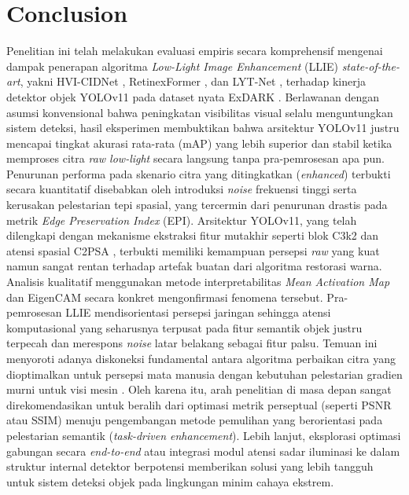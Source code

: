 ﻿\documentclass[conference]{IEEEtran}
\begin{document}
\section{Conclusion}
Penelitian ini telah melakukan evaluasi empiris secara komprehensif mengenai dampak penerapan algoritma \textit{Low-Light Image Enhancement} (LLIE) \textit{state-of-the-art}, yakni HVI-CIDNet \cite{yan2025hvi}, RetinexFormer \cite{cai2023retinexformer}, dan LYT-Net \cite{brateanu2025lytnet}, terhadap kinerja detektor objek YOLOv11 pada dataset nyata ExDARK \cite{loh2019exdark}. Berlawanan dengan asumsi konvensional bahwa peningkatan visibilitas visual selalu menguntungkan sistem deteksi, hasil eksperimen membuktikan bahwa arsitektur YOLOv11 justru mencapai tingkat akurasi rata-rata (mAP) yang lebih superior dan stabil ketika memproses citra \textit{raw low-light} secara langsung tanpa pra-pemrosesan apa pun.
Penurunan performa pada skenario citra yang ditingkatkan (\textit{enhanced}) terbukti secara kuantitatif disebabkan oleh introduksi \textit{noise} frekuensi tinggi serta kerusakan pelestarian tepi spasial, yang tercermin dari penurunan drastis pada metrik \textit{Edge Preservation Index} (EPI). Arsitektur YOLOv11, yang telah dilengkapi dengan mekanisme ekstraksi fitur mutakhir seperti blok C3k2 dan atensi spasial C2PSA \cite{khanam2024yolov11}, terbukti memiliki kemampuan persepsi \textit{raw} yang kuat namun sangat rentan terhadap artefak buatan dari algoritma restorasi warna. Analisis kualitatif menggunakan metode interpretabilitas \textit{Mean Activation Map} dan EigenCAM \cite{metrics2026formulas} secara konkret mengonfirmasi fenomena tersebut. Pra-pemrosesan LLIE mendisorientasi persepsi jaringan sehingga atensi komputasional yang seharusnya terpusat pada fitur semantik objek justru terpecah dan merespons \textit{noise} latar belakang sebagai fitur palsu.
Temuan ini menyoroti adanya diskoneksi fundamental antara algoritma perbaikan citra yang dioptimalkan untuk persepsi mata manusia dengan kebutuhan pelestarian gradien murni untuk visi mesin \cite{wu2024llieeffect}. Oleh karena itu, arah penelitian di masa depan sangat direkomendasikan untuk beralih dari optimasi metrik perseptual (seperti PSNR atau SSIM) menuju pengembangan metode pemulihan yang berorientasi pada pelestarian semantik (\textit{task-driven enhancement}). Lebih lanjut, eksplorasi optimasi gabungan secara \textit{end-to-end} atau integrasi modul atensi sadar iluminasi ke dalam struktur internal detektor berpotensi memberikan solusi yang lebih tangguh untuk sistem deteksi objek pada lingkungan minim cahaya ekstrem.


\end{document}
